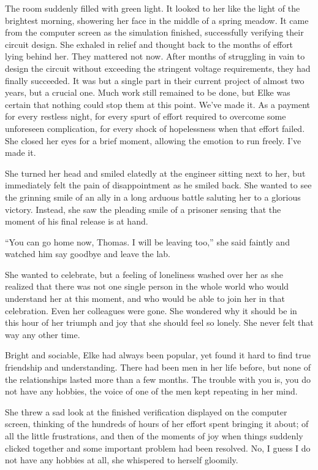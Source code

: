 The room suddenly filled with green light. It looked to her like the light of the brightest morning, showering her face in the middle of a spring meadow. It came from the computer screen as the simulation finished, successfully verifying their circuit design. She exhaled in relief and thought back to the months of effort lying behind her. They mattered not now. After months of struggling in vain to design the circuit without exceeding the stringent voltage requirements, they had finally succeeded. It was but a single part in their current project of almost two years, but a crucial one. Much work still remained to be done, but Elke was certain that nothing could stop them at this point. We've made it. As a payment for every restless night, for every spurt of effort required to overcome some unforeseen complication, for every shock of hopelessness when that effort failed. She closed her eyes for a brief moment, allowing the emotion to run freely. I've made it.

She turned her head and smiled elatedly at the engineer sitting next to her, but immediately felt the pain of disappointment as he smiled back. She wanted to see the grinning smile of an ally in a long arduous battle saluting her to a glorious victory. Instead, she saw the pleading smile of a prisoner sensing that the moment of his final release is at hand.

``You can go home now, Thomas. I will be leaving too,'' she said faintly and watched him say goodbye and leave the lab.

She wanted to celebrate, but a feeling of loneliness washed over her as she realized that there was not one single person in the whole world who would understand her at this moment, and who would be able to join her in that celebration. Even her colleagues were gone. She wondered why it should be in this hour of her triumph and joy that she should feel so lonely. She never felt that way any other time.

Bright and sociable, Elke had always been popular, yet found it hard to find true friendship and understanding. There had been men in her life before, but none of the relationships lasted more than a few months. The trouble with you is, you do not have any hobbies, the voice of one of the men kept repeating in her mind.

She threw a sad look at the finished verification displayed on the computer screen, thinking of the hundreds of hours of her effort spent bringing it about; of all the little frustrations, and then of the moments of joy when things suddenly clicked together and some important problem had been resolved. No, I guess I do not have any hobbies at all, she whispered to herself gloomily.


